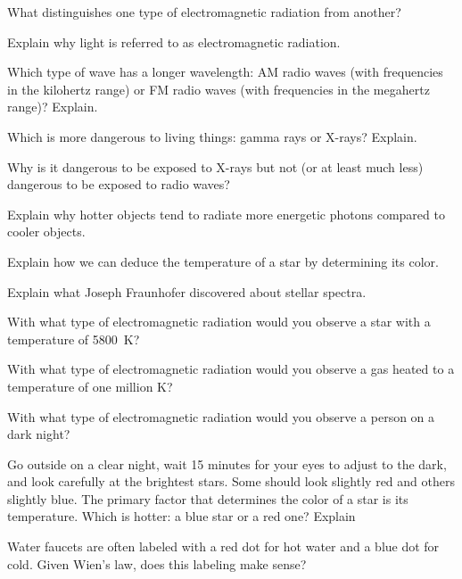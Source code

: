 \documentclass[addpoints]{exam}
\begin{document}
\begin{questions}

\question
What distinguishes one type of electromagnetic radiation from another?

\question
Explain why light is referred to as electromagnetic radiation.

\question
Which type of wave has a longer wavelength: AM radio waves (with frequencies in the kilohertz range) or FM radio waves (with frequencies in the megahertz range)? Explain.


\question
Which is more dangerous to living things: gamma rays or X-rays? Explain.

\question
Why is it dangerous to be exposed to X-rays but not (or at least much less) dangerous to be exposed to radio waves?


\question
Explain why hotter objects tend to radiate more energetic photons compared to cooler objects.

\question
Explain how we can deduce the temperature of a star by determining its color.

\question
Explain what Joseph Fraunhofer discovered about stellar spectra.

\question
With what type of electromagnetic radiation would you observe a star with a temperature of \SI{5800}{K}?

\question
With what type of electromagnetic radiation would you observe a gas heated to a temperature of one million K?

\question
With what type of electromagnetic radiation would you observe a person on a dark night?


\question
Go outside on a clear night, wait 15 minutes for your eyes to adjust to the dark, and look carefully at the brightest stars. Some should look slightly red and others slightly blue. The primary factor that determines the color of a star is its temperature. Which is hotter: a blue star or a red one? Explain

\question
Water faucets are often labeled with a red dot for hot water and a blue dot for cold. Given Wien's law, does this labeling make sense?


\end{questions}
\end{document}
